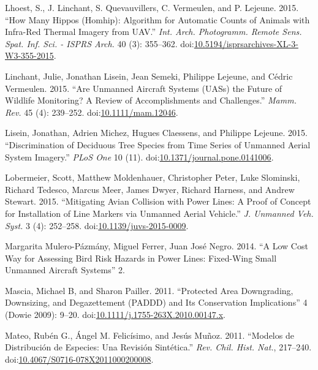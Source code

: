 \documentclass[]{interact}
\theoremstyle{plain}%
\theoremstyle{definition}
\theoremstyle{remark}
\begin{document}
\hypertarget{ref-lhoest_how_2015}{}
Lhoest, S., J. Linchant, S. Quevauvillers, C. Vermeulen, and P. Lejeune.
2015. ``How Many Hippos (Homhip): Algorithm for Automatic Counts of
Animals with Infra-Red Thermal Imagery from UAV.'' \emph{Int. Arch.
Photogramm. Remote Sens. Spat. Inf. Sci. - ISPRS Arch.} 40 (3):
355--362.
doi:\href{https://doi.org/10.5194/isprsarchives-XL-3-W3-355-2015}{10.5194/isprsarchives-XL-3-W3-355-2015}.

\hypertarget{ref-linchant_are_2015}{}
Linchant, Julie, Jonathan Lisein, Jean Semeki, Philippe Lejeune, and
Cédric Vermeulen. 2015. ``Are Unmanned Aircraft Systems (UASs) the
Future of Wildlife Monitoring? A Review of Accomplishments and
Challenges.'' \emph{Mamm. Rev.} 45 (4): 239--252.
doi:\href{https://doi.org/10.1111/mam.12046}{10.1111/mam.12046}.

\hypertarget{ref-lisein_discrimination_2015}{}
Lisein, Jonathan, Adrien Michez, Hugues Claessens, and Philippe Lejeune.
2015. ``Discrimination of Deciduous Tree Species from Time Series of
Unmanned Aerial System Imagery.'' \emph{PLoS One} 10 (11).
doi:\href{https://doi.org/10.1371/journal.pone.0141006}{10.1371/journal.pone.0141006}.

\hypertarget{ref-lobermeier_mitigating_2015}{}
Lobermeier, Scott, Matthew Moldenhauer, Christopher Peter, Luke
Slominski, Richard Tedesco, Marcus Meer, James Dwyer, Richard Harness,
and Andrew Stewart. 2015. ``Mitigating Avian Collision with Power Lines:
A Proof of Concept for Installation of Line Markers via Unmanned Aerial
Vehicle.'' \emph{J. Unmanned Veh. Syst.} 3 (4): 252--258.
doi:\href{https://doi.org/10.1139/juvs-2015-0009}{10.1139/juvs-2015-0009}.

\hypertarget{ref-margarita_mulero-pazmany_juan_jose_negro_low_2014}{}
Margarita Mulero-Pázmány, Miguel Ferrer, Juan José Negro. 2014. ``A Low
Cost Way for Assessing Bird Risk Hazards in Power Lines: Fixed-Wing
Small Unmanned Aircraft Systems'' 2.

\hypertarget{ref-mascia_protected_2011}{}
Mascia, Michael B, and Sharon Pailler. 2011. ``Protected Area
Downgrading, Downsizing, and Degazettement (PADDD) and Its Conservation
Implications'' 4 (Dowie 2009): 9--20.
doi:\href{https://doi.org/10.1111/j.1755-263X.2010.00147.x}{10.1111/j.1755-263X.2010.00147.x}.

\hypertarget{ref-mateo_modelos_2011}{}
Mateo, Rubén G., Ángel M. Felicísimo, and Jesús Muñoz. 2011. ``Modelos
de Distribución de Especies: Una Revisión Sintética.'' \emph{Rev. Chil.
Hist. Nat.}, 217--240.
doi:\href{https://doi.org/10.4067/S0716-078X2011000200008}{10.4067/S0716-078X2011000200008}.
\end{document}
